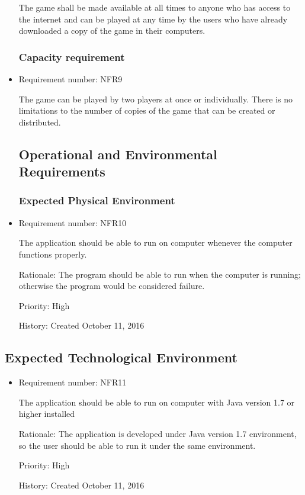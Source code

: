 \documentclass[12pt,letterpaper]{article}
\begin{document}
\begin{itemize}
   	The game shall be made available at all times to anyone who has access to the internet and can be played at any time by the users who have already downloaded a copy of the game in their computers.
\subsubsection{Capacity requirement}

\item Requirement number: NFR9

   	The game can be played by two players at once or individually. There is no limitations to the number of copies of the game that can be created or distributed.
\subsection{Operational and Environmental Requirements}
\subsubsection{Expected Physical Environment}

	\item Requirement number: NFR10

	The application should be able to run on computer whenever the computer functions properly.

	Rationale: The program should be able to run when the computer is running; otherwise the program would be considered failure.

	Priority: High
	
	History: Created October 11, 2016
\end{itemize}
\subsection{Expected Technological Environment}
\begin{itemize}
	\item Requirement number: NFR11

	The application should be able to run on computer with Java version 1.7 or higher installed

	Rationale: The application is developed under Java version 1.7 environment, so the user should be able to run it under the same environment. 

	Priority: High

	History: Created October 11, 2016
\end{itemize}
\end{document}
